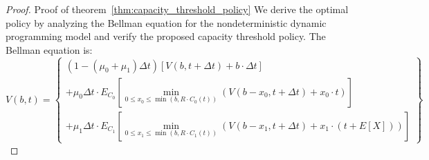 \documentclass[opre,sglanonrev]{informs4}
\begin{document}
\begin{proof}{Proof of theorem~\ref{thm:capacity_threshold_policy}}
We derive the optimal policy by analyzing the Bellman equation for the nondeterministic dynamic programming model and verify the proposed capacity threshold policy. The Bellman equation is:
\[
V(b, t) = \left\{ 
\begin{array}{l} 
(1 - (\mu_0 + \mu_1) \Delta t) \left[ V(b, t + \Delta t) + b \cdot \Delta t \right] \\ 
+ \mu_0 \Delta t \cdot E_{C_0} \left[ \min_{0 \leq x_0 \leq \min(b, R \cdot C_0(t))} \left( V(b - x_0, t + \Delta t) + x_0 \cdot t \right) \right] \\ 
+ \mu_1 \Delta t \cdot E_{C_1} \left[ \min_{0 \leq x_1 \leq \min(b, R \cdot C_1(t))} \left( V(b - x_1, t + \Delta t) + x_1 \cdot (t + E[X]) \right) \right] 
\end{array} 
\right\}
\]


\end{proof}
\end{document}
